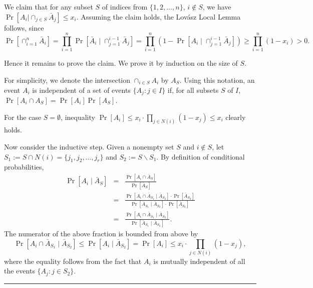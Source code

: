 \documentclass[twoside]{article}
\newenvironment{proof}{{\it Proof.}}{\hfill\rule{2mm}{2mm}}
\begin{document}
\begin{proof}
We claim that for any subset $S$ of indices from $\{1,2,\dots,n\}$, $i\not\in S$, we have $\Pr[A_i|\cap_{j\in S}\bar{A}_j]\leq x_i$. Assuming the claim holds, the Lov\'{a}sz Local Lemma follows, since
$$\Pr[\cap_{i=1}^{n}\bar{A}_i]=\prod_{i=1}^{n}\Pr[\bar{A}_i\mid\cap_{j=1}^{i-1}\bar{A}_j]=\prod_{i=1}^{n}(1-\Pr[A_i\mid\cap_{j=1}^{i-1}\bar{A}_j])\geq\prod_{i=1}^{n}(1-x_i)>0.$$

Hence it remains to prove the claim. We prove it by induction on the size of $S$.

For simplicity, we denote the intersection $\cap_{i\in S}A_i$ by $A_S$. Using this notation, an event $A_i$ is independent of a set of events $\{A_j:j\in I\}$ if, for all subsets $S$ of $I$, $\Pr[A_i\cap A_S]=\Pr[A_i]\Pr[A_S]$.

For the case $S=\emptyset$, inequality $\Pr[A_i]\leq x_i\cdot\prod_{j\in N(i)}(1-x_j)\leq x_i$ clearly holds.

Now consider the inductive step. Given a nonempty set $S$ and $i\not\in S$, let $S_1:=S\cap N(i)=\{j_1,j_2,\dots,j_r\}$ and $S_2:=S\backslash S_1$. By definition of conditional probabilities,
\begin{eqnarray*}
\Pr[A_i\mid\bar{A}_S]&=&\frac{\Pr[A_i\cap\bar{A}_S]}{\Pr[\bar{A}_S]}\\
&=&\frac{\Pr[A_i\cap\bar{A}_{S_1}\mid\bar{A}_{S_2}]\cdot\Pr[\bar{A}_{S_2}]}{\Pr[\bar{A}_{S_1}\mid\bar{A}_{S_2}]\cdot\Pr[\bar{A}_{S_2}]}\\
&=&\frac{\Pr[A_i\cap\bar{A}_{S_1}\mid\bar{A}_{S_2}]}{\Pr[\bar{A}_{S_1}\mid\bar{A}_{S_2}]}.
\end{eqnarray*}
The numerator of the above fraction is bounded from above by
$$\Pr[A_i\cap\bar{A}_{S_1}\mid\bar{A}_{S_2}]\leq\Pr[A_i\mid\bar{A}_{S_2}]=\Pr[A_i]\leq x_i\cdot\prod_{j\in N(i)}(1-x_j),$$
where the equality follows from the fact that $A_i$ is mutually independent of all the events $\{A_j:j\in S_2\}$.


\end{proof}
\end{document}
